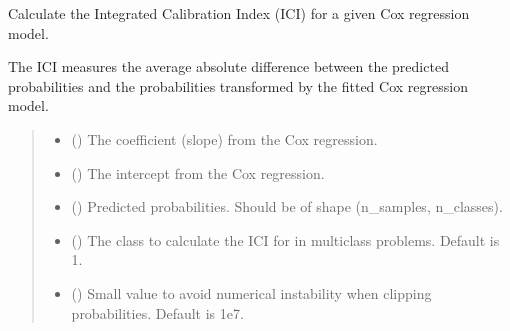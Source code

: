\documentclass[letterpaper,10pt,english]{sphinxmanual}
\begin{document}

\begin{fulllineitems}
\label{\detokenize{calzone:calzone.metrics.cal_ICI_cox}}
\pysigstartsignatures
{}
\pysigstopsignatures
\sphinxAtStartPar
Calculate the Integrated Calibration Index (ICI) for a given Cox regression model.

\sphinxAtStartPar
The ICI measures the average absolute difference between the predicted probabilities
and the probabilities transformed by the fitted Cox regression model.
\begin{quote}\begin{description}
\begin{itemize}
\item {} 
\sphinxAtStartPar
{} () \textendash{} The coefficient (slope) from the Cox regression.

\item {} 
\sphinxAtStartPar
{} () \textendash{} The intercept from the Cox regression.

\item {} 
\sphinxAtStartPar
{} () \textendash{} Predicted probabilities. Should be of shape (n\_samples, n\_classes).

\item {} 
\sphinxAtStartPar
{} () \textendash{} The class to calculate the ICI for in multi\sphinxhyphen{}class problems. Default is 1.

\item {} 
\sphinxAtStartPar
{} () \textendash{} Small value to avoid numerical instability when clipping probabilities. Default is 1e\sphinxhyphen{}7.


\end{itemize}
\end{description}
\end{quote}
\end{fulllineitems}
\end{document}
